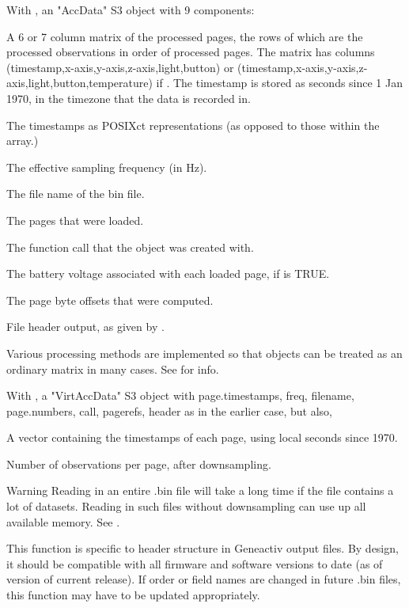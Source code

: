 \documentclass[a4paper]{book}
\begin{document}
%
\begin{Value}
With , an "AccData" S3 object with 9 components:
\begin{ldescription}
\item[\code{data.out}] A 6 or 7 column matrix of the processed pages, the rows of which are the processed observations in order of processed pages.  The matrix has columns (timestamp,x-axis,y-axis,z-axis,light,button) or (timestamp,x-axis,y-axis,z-axis,light,button,temperature) if . The timestamp is stored as seconds since 1 Jan 1970, in the timezone that the data is recorded in.
\item[\code{page.timestamps}] The timestamps as POSIXct representations (as opposed to those within the  array.)
\item[\code{freq}] The effective sampling frequency (in Hz).
\item[\code{filename}] The file name of the bin file.
\item[\code{page.numbers}] The pages that were loaded.
\item[\code{call}] The function call that the object was created with.
\item[\code{volt}] The battery voltage associated with each loaded page, if  is TRUE.
\item[\code{pagerefs}] The page byte offsets that were computed.
\item[\code{header}] File header output, as given by .

\end{ldescription}
Various processing methods are implemented so that  objects can be treated as an ordinary matrix in many cases. See  for info.

With , a "VirtAccData" S3 object with page.timestamps, freq, filename, page.numbers, call, pagerefs, header as in the earlier case, but also,
\begin{ldescription}
\item[\code{data.out}] A vector containing the timestamps of each page, using local seconds since 1970.
\item[\code{nobs}] Number of observations per page, after downsampling.
\end{ldescription}
\end{Value}
%
\begin{Section}{Warning}
Reading in an entire .bin file will take a long time if the file contains a lot of datasets. Reading in such files without downsampling can use up all available memory. See .

This function is specific to header structure in Geneactiv output files. By design, it should be compatible with all firmware and software versions to date (as of version of current release). If order or field names are changed in future .bin files, this function may have to be updated appropriately.
\end{Section}
\end{document}
